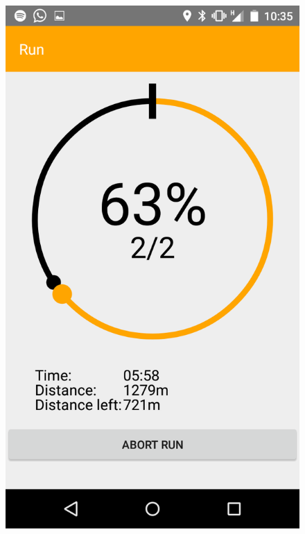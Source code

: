 \begin{figure}
\centering
\begin{minipage}{.4\textwidth}
  \centering
  \includegraphics[width=.8\linewidth]{abb/bsp/bsp19}
  \label{fig:bsp19}
\end{minipage}
\begin{minipage}{.4\textwidth}
  \centering

\end{minipage}
\end{figure}
